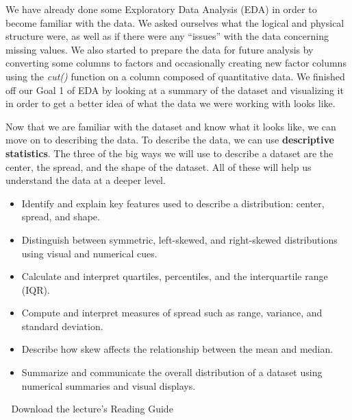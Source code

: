 \documentclass[
  letterpaper,
  DIV=11,
  numbers=noendperiod]{scrreprt}
\providecommand{\tightlist}{%
  \setlength{\itemsep}{0pt}\setlength{\parskip}{0pt}}
\begin{document}
We have already done some Exploratory Data Analysis (EDA) in order to
become familiar with the data. We asked ourselves what the logical and
physical structure were, as well as if there were any ``issues'' with
the data concerning missing values. We also started to prepare the data
for future analysis by converting some columns to factors and
occasionally creating new factor columns using the \emph{cut()} function
on a column composed of quantitative data. We finished off our Goal 1 of
EDA by looking at a summary of the dataset and visualizing it in order
to get a better idea of what the data we were working with looks like.

Now that we are familiar with the dataset and know what it looks like,
we can move on to describing the data. To describe the data, we can use
\textbf{descriptive statistics}. The three of the big ways we will use
to describe a dataset are the center, the spread, and the shape of the
dataset. All of these will help us understand the data at a deeper
level.

\begin{itemize}
\tightlist
\item
  Identify and explain key features used to describe a distribution:
  center, spread, and shape.\\
\item
  Distinguish between symmetric, left-skewed, and right-skewed
  distributions using visual and numerical cues.\\
\item
  Calculate and interpret quartiles, percentiles, and the interquartile
  range (IQR).\\
\item
  Compute and interpret measures of spread such as range, variance, and
  standard deviation.\\
\item
  Describe how skew affects the relationship between the mean and
  median.\\
\item
  Summarize and communicate the overall distribution of a dataset using
  numerical summaries and visual displays.\\
\end{itemize}

\begin{tcolorbox}[enhanced jigsaw, leftrule=.75mm, arc=.35mm, coltitle=black, rightrule=.15mm, bottomrule=.15mm, toprule=.15mm, left=2mm, colbacktitle=quarto-callout-tip-color!10!white, title=\textcolor{quarto-callout-tip-color}{\faLightbulb}\hspace{0.5em}{Supplemental Material}, toptitle=1mm, breakable, colframe=quarto-callout-tip-color-frame, bottomtitle=1mm, titlerule=0mm, colback=white, opacityback=0, opacitybacktitle=0.6]

📄 Download the lecture's Reading Guide

\end{tcolorbox}
\end{document}
